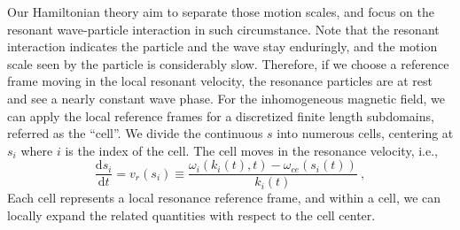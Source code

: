 Our Hamiltonian theory aim to separate those motion scales, and focus on the resonant wave-particle interaction in such circumstance.  
Note that the resonant interaction indicates the particle and the wave stay enduringly, and the motion scale seen by the particle is considerably slow. 
Therefore, if we choose a reference frame moving in the local resonant velocity, the resonance particles are at rest and see a nearly constant wave phase.
For the inhomogeneous magnetic field, we can apply the local reference frames for a discretized finite length subdomains, referred as the ``cell''.
We divide the continuous $s$ into numerous cells, centering at $s_i$ where $i$ is the index of the cell. The cell moves in the resonance velocity, i.e.,
\begin{equation}\label{eq.resonance}
    \frac{\mathrm{d} s_i}{\mathrm{d}t} = v_r(s_i) \equiv \frac{\omega_{i}\left(k_{i}(t), t\right)-\omega_{ce}\left(s_{i}(t)\right)}{k_{i}(t)}~,
\end{equation}
Each cell represents a local resonance reference frame, and within a cell, we can locally expand the related quantities with respect to the cell center.

